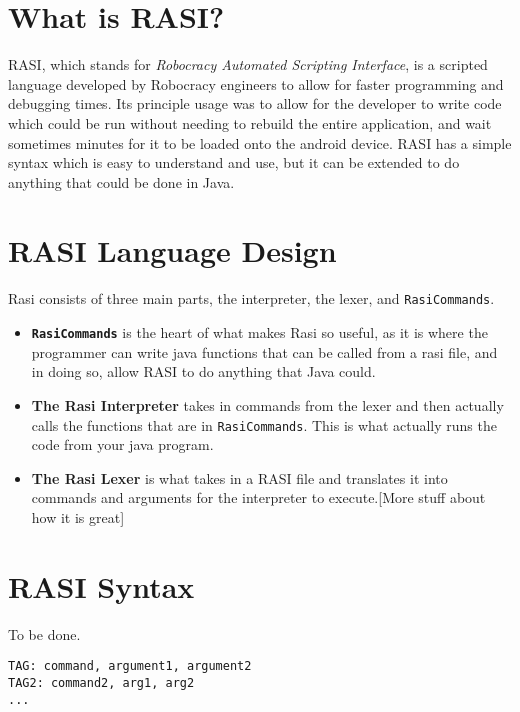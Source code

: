 \documentclass{article}
\begin{document}
\section{What is RASI?}
RASI, which stands for \textit{Robocracy Automated Scripting Interface}, is a scripted language developed by Robocracy engineers to allow for faster programming and debugging times. Its principle usage was to allow for the developer to write code which could be run without needing to rebuild the entire application, and wait sometimes minutes for it to be loaded onto the android device. RASI has a simple syntax which is easy to understand and use, but it can be extended to do anything that could be done in Java.

\section{RASI Language Design}
Rasi consists of three main parts, the interpreter, the lexer, and \texttt{RasiCommands}.
\begin{itemize}
  \item \textbf{\texttt{RasiCommands}} is the heart of what makes Rasi so useful, as it is where the programmer can write java functions that can be called from a rasi file, and in doing so, allow RASI to do anything that Java could.
  \item \textbf{The Rasi Interpreter} takes in commands from the lexer and then actually calls the functions that are in \texttt{RasiCommands}. This is what actually runs the code from your java program.
  \item \textbf{The Rasi Lexer} is what takes in a RASI file and translates it into commands and arguments for the interpreter to execute.[More stuff about how it is great]
\end{itemize}

\section{RASI Syntax}
To be done.
\begin{verbatim}
TAG: command, argument1, argument2
TAG2: command2, arg1, arg2
...
\end{verbatim}
\end{document}
